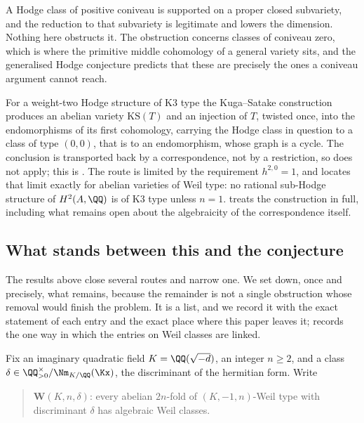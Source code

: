 \begin{remark}[Coniveau]\label{rem:coniveauscope}
A Hodge class of positive coniveau is supported on a proper closed
subvariety, and the reduction to that subvariety is legitimate and lowers the
dimension. Nothing here obstructs it. The obstruction concerns classes of
coniveau zero, which is where the primitive middle cohomology of a general
variety sits, and the generalised Hodge conjecture predicts that these are
precisely the ones a coniveau argument cannot reach.
\end{remark}

\begin{remark}\label{rem:ksscope}
For a weight-two Hodge structure of K3 type the Kuga--Satake construction
produces an abelian variety $\mathrm{KS}(T)$ and an injection of $T$, twisted
once, into the endomorphisms of its first cohomology, carrying the Hodge class
in question to a class of type $(0,0)$, that is to an endomorphism, whose graph
is a cycle. The conclusion is transported back by a correspondence, not by a
restriction, so  does not apply; this is
. The route is limited by the requirement
$h^{2,0}=1$, and  locates that limit exactly for abelian
varieties of Weil type: no rational sub-Hodge structure of $H^{2}(A,\QQ)$ is of
K3 type unless $n=1$.  treats the construction in full, including
what remains open about the algebraicity of the correspondence itself.
\end{remark}

\subsection{What stands between this and the conjecture}
\label{ssec:closuremap}

The results above close several routes and narrow one. We set down, once
and precisely, what remains, because the remainder is not a single
obstruction whose removal would finish the problem. It is a list, and we
record it with the exact statement of each entry and the exact place where
this paper leaves it;  records the one way in which the
entries on Weil classes are linked.

Fix an imaginary quadratic field $K=\QQ(\sqrt{-d})$, an integer $n\ge2$, and a
class $\delta\in\QQ^{\times}_{>0}/\Nm_{K/\QQ}(\Kx)$, the discriminant of the
hermitian form. Write
\begin{quote}
$\mathbf{W}(K,n,\delta)$: every abelian $2n$-fold of $(K,-1,n)$-Weil type with
discriminant $\delta$ has algebraic Weil classes.
\end{quote}

